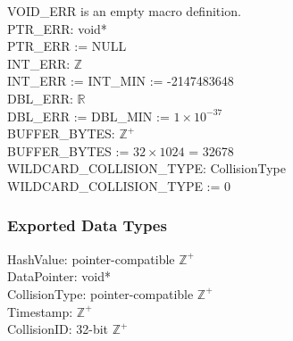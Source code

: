 \documentclass[12pt]{article}
\newcommand{\R}{$\mathbb{R}$}
\newcommand{\Z}{$\mathbb{Z}$}
\newcommand{\UZ}{$\mathbb{Z}^+$}
\begin{document}
%
%
%
	VOID_ERR is an empty macro definition. \\
	\newline
	PTR_ERR: void* \\
	PTR_ERR := NULL \\
	\newline
	INT_ERR: \Z \\
	INT_ERR := INT_MIN := -2147483648 \\
	\newline
	DBL_ERR: \R \\
	DBL_ERR := DBL_MIN := $1 \times 10^{-37}$ \\
	\newline
	BUFFER_BYTES: \UZ \\
	BUFFER_BYTES := $32 \times 1024$ = 32678 \\
	\newline
	WILDCARD_COLLISION_TYPE: CollisionType \\
	WILDCARD_COLLISION_TYPE := 0 
	

\subsubsection{Exported Data Types} \label{SecEDTControl}
	HashValue: pointer-compatible \UZ \\
	DataPointer: void* \\
	CollisionType: pointer-compatible \UZ \\
	Timestamp: \UZ \\
	CollisionID: 32-bit \UZ
\end{document}
